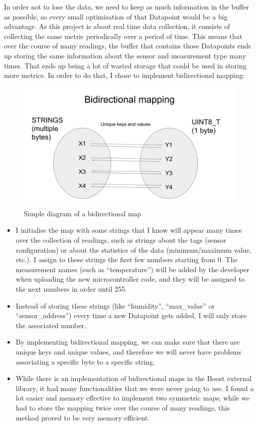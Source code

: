 \documentclass[12pt]{article}
\begin{document}
In order not to lose the data, we need to keep as much information in the buffer as possible, so every small optimisation of that Datapoint would be a big advantage. As this project is about real time data collection, it consists of collecting the same metric periodically over a period of time. This means that over the course of many readings, the buffer that contains those Datapoints ends up storing the same information about the sensor and measurement type many times. That ends up being a lot of wasted storage that could be used in storing more metrics. In order to do that, I chose to implement bidirectional mapping: \par

\begin{figure}[h]
\includegraphics[scale=0.4]{Bimap-diagram}
\centering
\caption{Simple diagram of a bidirectional map}
\label{fig:bimaps}
\end{figure}

\begin{itemize}
    \item I initialise the map with some strings that I know will appear many times over the collection of readings, such as strings about the tags (sensor configuration) or about the statistics of the data (minimum/maximum value, etc.). I assign to these strings the first few numbers starting from 0. The measurement names (such as ``temperature'') will be added by the developer when uploading the new microcontroller code, and they will be assigned to the next numbers in order until 255.
    \item Instead of storing these strings (like ``humidity'', ``max\_value'' or ``sensor\_address'') every time a new Datapoint gets added, I will only store the associated number. 
    \item By implementing bidirectional mapping, we can make sure that there are unique keys and unique values, and therefore we will never have problems associating a specific byte to a specific string.
    \item While there is an implementation of bidirectional maps in the Boost external library, it had many functionalities that we were never going to use. I found a lot easier and memory effective to implement two symmetric maps; while we had to store the mapping twice over the course of many readings, this method proved to be very memory efficient. 
\end{itemize}
\end{document}
